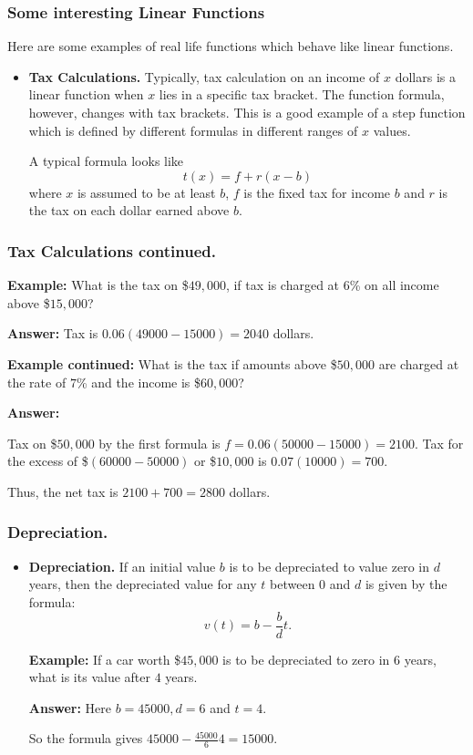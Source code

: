 \begin{frame} %
  \frametitle{Some interesting Linear  Functions}
  Here are some examples of real life functions which behave like linear functions.
 \begin{itemize}%
\item {\bf Tax Calculations.}
Typically, tax calculation on an income of $x$ dollars is a linear function when $x$ lies in a
specific tax bracket.
The function formula, however, changes with tax brackets. This is a good example of a step function 
which is defined by different formulas in different ranges of $x$ values.

A typical formula looks like 
$$t(x) = f+r(x-b)$$
where $x$ is assumed to be at least $b$, $f$ is the fixed tax for income $b$ and $r$ is the tax 
on each dollar earned above $b$.
\end{itemize}

\end{frame}
\begin{frame}%
  \frametitle{Tax Calculations continued.}

{\bf Example:} What is the tax on \$$49,000$, if tax is charged at $6$\% on all income 
above \$$15,000$?



{\bf Answer:} Tax is $0.06 (49000-15000)=2040$ dollars.

{\bf Example continued:}
What is the tax if amounts above \$$50,000$ are charged at the rate of $7$\% 
and the income is \$$60,000$?

{\bf Answer:}

Tax on \$$50,000$ by the  first formula is $f=0.06(50000-15000)=2100$.
Tax for the excess of \$$(60000-50000)$ or \$$10,000$ is $0.07(10000) = 700$.

Thus, the net tax is $2100+700=2800$ dollars.

\end{frame}
\begin{frame}%
  \frametitle{Depreciation.}
  \begin{itemize}%

\item {\bf Depreciation.} If an initial value $b$ is to be depreciated to value zero in $d$ years, then the depreciated value 
for any $t$ between $0$ and $d$ is given by the formula:
$$ v(t) = b - \frac{b}{d}t.$$

{\bf Example:} If a car worth \$$45,000$ is to be depreciated to zero in $6$ years, what is its value after 
$4$ years.

{\bf Answer:}
Here $b=45000, d=6$ and $t=4$.

So the formula gives $45000-\frac{45000}{6}4 = 15000$.
\end{itemize}
\end{frame}

